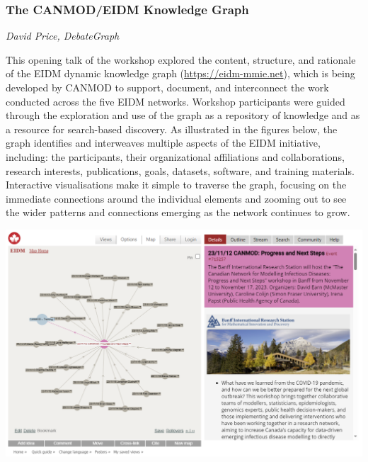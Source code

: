 \subsubsection*{The CANMOD/EIDM Knowledge Graph}
\textit{David Price, DebateGraph}

This opening talk of the workshop explored the content, structure, and rationale of the EIDM dynamic knowledge graph (\url{https://eidm-mmie.net}), which is being developed by CANMOD to support, document, and interconnect the work conducted across the five EIDM networks. Workshop participants were guided through the exploration and use of the graph as a repository of knowledge and as a resource for search-based discovery. As illustrated in the figures below, the graph identifies and interweaves multiple aspects of the EIDM initiative, including: the participants, their organizational affiliations and collaborations, research interests, publications, goals, datasets, software, and training materials. Interactive visualisations make it simple to traverse the graph, focusing on the immediate connections around the individual elements and zooming out to see the wider patterns and connections emerging as the network continues to grow.

\begin{center}
\includegraphics[width=\textwidth]{talk_summaries/EIDM_CANMOD.png}
\end{center}
